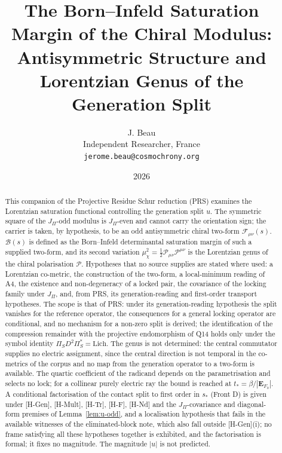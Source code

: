 \documentclass[11pt]{article}
\title{
  The Born--Infeld Saturation Margin of the Chiral Modulus:\\
  Antisymmetric Structure and Lorentzian Genus
  of the Generation Split
}
\author{J. Beau\\
Independent Researcher, France\\
\texttt{jerome.beau@cosmochrony.org}}
\date{2026}
\theoremstyle{definition}
\theoremstyle{remark}
\newcommand{\JPi}{J_{\Pi}}
\newcommand{\Fchi}{\mathcal{F}}
\newcommand{\Pchi}{\mathcal{P}}
\newcommand{\Bsat}{\mathcal{B}}
\newcommand{\muchi}{\mu_{\chi}^{2}}
\begin{document}
  \maketitle

  \begin{abstract}
    This companion of the Projective Residue Schur reduction (PRS) examines the Lorentzian saturation functional
    controlling the generation split \texorpdfstring{$u$}{u}.
    The symmetric square of the \texorpdfstring{$\JPi$}{J_Π}-odd modulus is \texorpdfstring{$\JPi$}{J_Π}-even and
    cannot carry the orientation
    sign; the carrier is taken, by hypothesis, to be an odd antisymmetric chiral two-form
    \texorpdfstring{$\Fchi_{\mu\nu}(s)$}{F_{μν}(s)}.
    \texorpdfstring{$\Bsat(s)$}{B_sat(s)} is defined as the Born--Infeld determinantal saturation margin of such a
    supplied
    two-form, and its second variation
    \texorpdfstring{$\muchi = \tfrac12 \Pchi_{\mu\nu} \Pchi^{\mu\nu}$}{μ_χ² = ½ P_{μν} P^{μν}} is the Lorentzian genus
    of the chiral
    polarisation \texorpdfstring{$\Pchi$}{P}.
    Hypotheses that no source supplies are stated where used: a Lorentzian co-metric, the construction of the two-form,
    a local-minimum reading of A4, the existence and non-degeneracy of a locked pair, the covariance of the locking
    family under \texorpdfstring{$J_\Pi$}{J_Π}, and, from PRS, its generation-reading and first-order transport
    hypotheses.
    The scope is that of PRS: under its generation-reading hypothesis the split vanishes for the reference operator, the
    consequences for a general locking operator are conditional, and no mechanism for a non-zero split is derived;
    the identification of the compression remainder with the projective endomorphism of Q14 holds only under the symbol
    identity \texorpdfstring{$\Pi_SD^2\Pi_S^*=\mathrm{Lich}$}{Π_S D² Π_S* = Lich}.
    The genus is not determined: the central commutator supplies no electric assignment, since the central direction is
    not temporal in the co-metrics of the corpus and no map from the generation operator to a two-form is available.
    The quartic coefficient of the radicand depends on the parametrisation and selects no lock; for a collinear purely
    electric ray the bound is reached at \texorpdfstring{$t_*=\beta/|\mathbf{E}_{F_0}|$}{t* = β/|E|}.
    A conditional factorisation of the contact split to first order in \texorpdfstring{$s_*$}{s*} (Front D) is given
    under [H-Gen], [H-Mult], [H-Tr], [H-F], [H-Nd] and the $\JPi$-covariance and diagonal-form premises of Lemma~\ref{lem:u-odd}, and a localisation hypothesis that fails
    in the available witnesses of the eliminated-block note, which also fall outside [H-Gen](i); no frame satisfying all these hypotheses together is exhibited, and the
    factorisation is formal; it fixes no magnitude.
    The magnitude \texorpdfstring{$|u|$}{|u|} is not predicted.
  \end{abstract}
\end{document}
